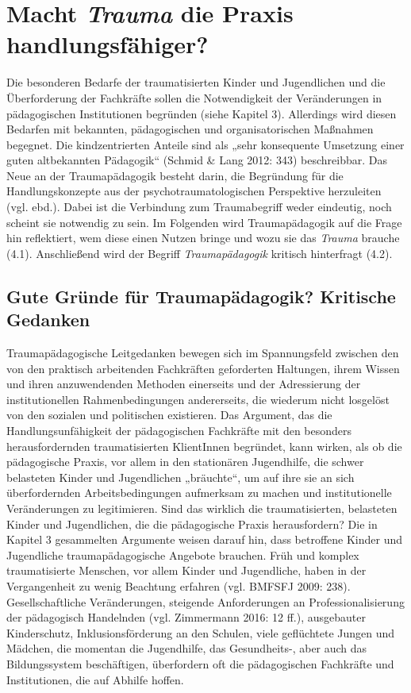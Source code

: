 \clearpage
\section{Macht \textit{Trauma} die Praxis handlungsfähiger?}
Die besonderen Bedarfe der traumatisierten Kinder und Jugendlichen und die Überforderung der Fachkräfte sollen die Notwendigkeit der Veränderungen in pädagogischen Institutionen begründen (siehe Kapitel 3). Allerdings wird diesen Bedarfen mit bekannten, pädagogischen und organisatorischen Maßnahmen begegnet. Die kindzentrierten Anteile sind als „sehr konsequente Umsetzung einer guten altbekannten Pädagogik“ (Schmid \& Lang 2012: 343) beschreibbar. Das Neue an der Traumapädagogik besteht darin, die Begründung für die Handlungskonzepte aus der psychotraumatologischen Perspektive herzuleiten (vgl. ebd.). Dabei ist die Verbindung zum Traumabegriff weder eindeutig, noch scheint sie notwendig zu sein. Im Folgenden wird Traumapädagogik auf die Frage hin reflektiert, wem diese einen Nutzen bringe und wozu sie das \textit{Trauma} brauche (4.1). Anschließend wird der Begriff \textit{Traumapädagogik} kritisch hinterfragt (4.2).

\subsection{Gute Gründe für Traumapädagogik? Kritische Gedanken}
Traumapädagogische Leitgedanken bewegen sich im Spannungsfeld zwischen den von den praktisch arbeitenden Fachkräften geforderten Haltungen, ihrem Wissen und ihren anzuwendenden Methoden einerseits und der Adressierung der institutionellen Rahmenbedingungen andererseits, die wiederum nicht losgelöst von den sozialen und politischen existieren. Das Argument, das die Handlungsunfähigkeit der pädagogischen Fachkräfte mit den besonders herausfordernden traumatisierten KlientInnen begründet, kann wirken, als ob die pädagogische Praxis, vor allem in den stationären Jugendhilfe, die schwer belasteten Kinder und Jugendlichen „bräuchte“, um auf ihre sie an sich überfordernden Arbeitsbedingungen aufmerksam zu machen und institutionelle Veränderungen zu legitimieren. Sind das wirklich die traumatisierten, belasteten Kinder und Jugendlichen, die die pädagogische Praxis herausfordern? Die in Kapitel 3 gesammelten Argumente weisen darauf hin, dass betroffene Kinder und Jugendliche traumapädagogische Angebote brauchen. Früh und komplex traumatisierte Menschen, vor allem Kinder und Jugendliche, haben in der Vergangenheit zu wenig Beachtung erfahren (vgl. BMFSFJ 2009: 238). Gesellschaftliche Veränderungen, steigende Anforderungen an Professionalisierung der pädagogisch Handelnden (vgl. Zimmermann 2016: 12 ff.), ausgebauter Kinderschutz, Inklusionsförderung an den Schulen, viele geflüchtete Jungen und Mädchen, die momentan die Jugendhilfe, das Gesundheits-, aber auch das Bildungssystem beschäftigen, überfordern oft die pädagogischen Fachkräfte und Institutionen, die auf Abhilfe hoffen.

